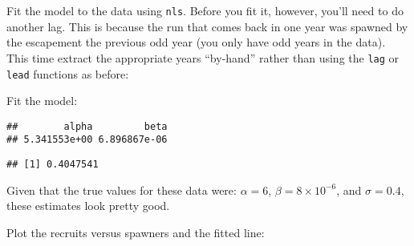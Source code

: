 \documentclass[]{book}
\newenvironment{Shaded}{\begin{snugshade}}{\end{snugshade}}
\newcommand{\KeywordTok}[1]{\textcolor[rgb]{0.13,0.29,0.53}{\textbf{#1}}}
\newcommand{\DataTypeTok}[1]{\textcolor[rgb]{0.13,0.29,0.53}{#1}}
\newcommand{\DecValTok}[1]{\textcolor[rgb]{0.00,0.00,0.81}{#1}}
\newcommand{\StringTok}[1]{\textcolor[rgb]{0.31,0.60,0.02}{#1}}
\newcommand{\CommentTok}[1]{\textcolor[rgb]{0.56,0.35,0.01}{\textit{#1}}}
\newcommand{\OperatorTok}[1]{\textcolor[rgb]{0.81,0.36,0.00}{\textbf{#1}}}
\newcommand{\NormalTok}[1]{#1}
\theoremstyle{definition}
\theoremstyle{definition}
\theoremstyle{definition}
\theoremstyle{remark}
\begin{document}
Fit the model to the data using \texttt{nls}. Before you fit it,
however, you'll need to do another lag. This is because the run that
comes back in one year was spawned by the escapement the previous odd
year (you only have odd years in the data). This time extract the
appropriate years ``by-hand'' rather than using the \texttt{lag} or
\texttt{lead} functions as before:

\begin{Shaded}
\end{Shaded}

Fit the model:

\begin{Shaded}
\end{Shaded}

\begin{verbatim}
##        alpha         beta 
## 5.341553e+00 6.896867e-06
\end{verbatim}

\begin{verbatim}
## [1] 0.4047541
\end{verbatim}

Given that the true values for these data were: \(\alpha = 6\),
\(\beta = 8\times10^{-6}\), and \(\sigma = 0.4\), these estimates look
pretty good.

Plot the recruits versus spawners and the fitted line:
\end{document}
